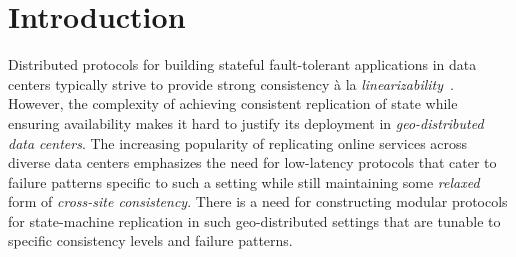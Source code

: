 \section{Introduction}
Distributed protocols for building stateful fault-tolerant applications in data centers typically strive to provide strong consistency \`a la \emph{linearizability}~\cite{Her91}.
However, the complexity of achieving consistent replication of state while ensuring availability makes it hard to justify its deployment in \emph{geo-distributed data centers}.
The increasing popularity of replicating online services across diverse data centers emphasizes 
the need for low-latency protocols that cater to failure patterns specific to such a setting while still maintaining 
some \emph{relaxed} form of \emph{cross-site consistency}. There is a need for constructing modular protocols for state-machine replication
in such geo-distributed settings that are tunable to specific consistency levels and failure patterns.
%

